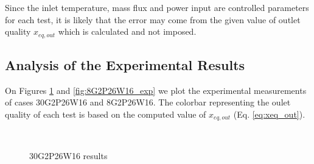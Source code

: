 \npar

Since the inlet temperature, mass flux and power input are controlled parameters for each test, it is likely that the error may come from the given value of outlet quality $x_{eq,out}$ which is calculated and not imposed.


\subsection{Analysis of the Experimental Results}

On Figures \ref{fig:30G2P26W16_exp} and \ref{fig:8G2P26W16_exp} we plot the experimental measurements of cases 30G2P26W16 and 8G2P26W16. The colorbar representing the oulet quality of each test is based on the computed value of $x_{eq,out}$ (Eq. \ref{eq:xeq_out}).

\begin{figure}[h!]
\centering

\\


\caption{30G2P26W16 results}
\label{fig:30G2P26W16_exp}
\end{figure}

